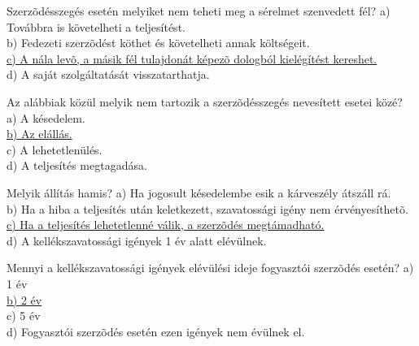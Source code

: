\begin{frame}

\begin{tcolorbox}[title={160. Kérdés}]
Szerzõdésszegés esetén melyiket nem teheti meg a sérelmet szenvedett fél?
\tcblower
a) Továbbra is követelheti a teljesítést.\\
b) Fedezeti szerzõdést köthet és követelheti annak költségeit.\\
\uline {c) A nála levõ, a másik fél tulajdonát képezõ dologból kielégítést kereshet.}\\
d) A saját szolgáltatását visszatarthatja.
\end{tcolorbox}

\begin{tcolorbox}[title={161. Kérdés}]
Az alábbiak közül melyik nem tartozik a szerzõdésszegés nevesített esetei közé?
\tcblower
a) A késedelem.\\
\uline {b) Az elállás.}\\
c) A lehetetlenülés.\\
d) A teljesítés megtagadása.
\end{tcolorbox}

\begin{tcolorbox}[title={162. Kérdés}]
Melyik állítás hamis?
\tcblower
a) Ha jogosult késedelembe esik a kárveszély átszáll rá.\\
b) Ha a hiba a teljesítés után keletkezett, szavatossági igény nem érvényesíthetõ.\\
\uline {c) Ha a teljesítés lehetetlenné válik, a szerzõdés megtámadható.}\\
d) A kellékszavatossági igények 1 év alatt elévülnek.
\end{tcolorbox}

\begin{tcolorbox}[title={163. Kérdés}]
Mennyi a kellékszavatossági igények elévülési ideje fogyasztói szerzõdés esetén?
\tcblower
a) 1 év\\
\uline {b) 2 év}\\
c) 5 év\\
d) Fogyasztói szerzõdés esetén ezen igények nem évülnek el.
\end{tcolorbox}

\end{frame}


